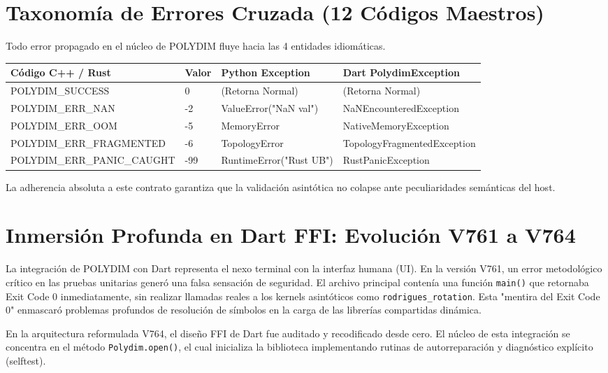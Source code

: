 \section{Taxonomía de Errores Cruzada (12 Códigos Maestros)}
Todo error propagado en el núcleo de POLYDIM fluye hacia las 4 entidades idiomáticas.
\begin{table}[h]
\centering
\begin{tabular}{|l|l|l|l|}
\hline
\textbf{Código C++ / Rust} & \textbf{Valor} & \textbf{Python Exception} & \textbf{Dart PolydimException} \\ \hline
POLYDIM\_SUCCESS           & 0              & (Retorna Normal)          & (Retorna Normal)               \\
POLYDIM\_ERR\_NAN          & -2             & ValueError("NaN val")     & NaNEncounteredException        \\
POLYDIM\_ERR\_OOM          & -5             & MemoryError               & NativeMemoryException          \\
POLYDIM\_ERR\_FRAGMENTED   & -6             & TopologyError             & TopologyFragmentedException    \\
POLYDIM\_ERR\_PANIC\_CAUGHT& -99            & RuntimeError("Rust UB")   & RustPanicException             \\ \hline
\end{tabular}
\end{table}
La adherencia absoluta a este contrato garantiza que la validación asintótica no colapse ante peculiaridades semánticas del host.

\section{Inmersión Profunda en Dart FFI: Evolución V761 a V764}

La integración de POLYDIM con Dart representa el nexo terminal con la interfaz humana (UI). En la versión V761, un error metodológico crítico en las pruebas unitarias generó una falsa sensación de seguridad. El archivo principal contenía una función \texttt{main()} que retornaba Exit Code 0 inmediatamente, sin realizar llamadas reales a los kernels asintóticos como \texttt{rodrigues\_rotation}. Esta "mentira del Exit Code 0" enmascaró problemas profundos de resolución de símbolos en la carga de las librerías compartidas dinámica.

En la arquitectura reformulada V764, el diseño FFI de Dart fue auditado y recodificado desde cero. El núcleo de esta integración se concentra en el método \texttt{Polydim.open()}, el cual inicializa la biblioteca implementando rutinas de autorreparación y diagnóstico explícito (selftest). 

